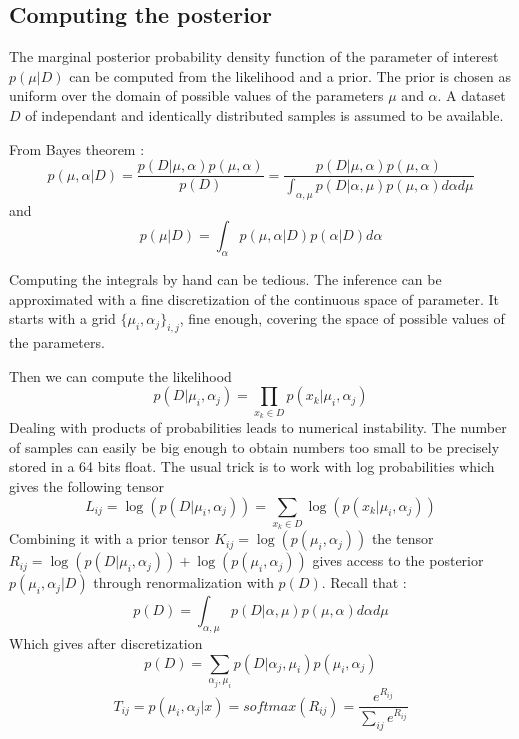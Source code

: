 \subsection{Computing the posterior} %
\label{sub:computing_the_posterior}

The marginal posterior probability density function of the parameter of interest $p(\mu|D)$ can be computed from the likelihood and a prior.
The prior is chosen as uniform over the domain of possible values of the parameters $\mu$ and $\alpha$.
A dataset $D$ of independant and identically distributed samples is assumed to be available.

From Bayes theorem : 
\begin{equation}
    p(\mu, \alpha | D) = \frac{p(D|\mu, \alpha) p(\mu, \alpha)}{p(D)} = \frac{p(D|\mu, \alpha) p(\mu, \alpha)}{\int_{\alpha, \mu} p(D|\alpha, \mu) p(\mu, \alpha) d\alpha d\mu}
\end{equation}
and
\begin{equation}
	p(\mu|D) = \int_{\alpha} p(\mu, \alpha | D) p(\alpha|D) d\alpha
\end{equation}

Computing the integrals by hand can be tedious.
The inference can be approximated with a fine discretization of the continuous space of parameter.
It starts with a grid $\{\mu_i, \alpha_j\}_{i,j}$, fine enough, covering the space of possible values of the parameters.

Then we can compute the likelihood
\begin{equation}
	p(D|\mu_i, \alpha_j) = \prod_{x_k\in D} p(x_k|\mu_i, \alpha_j)
\end{equation}
Dealing with products of probabilities leads to numerical instability.
The number of samples can easily be big enough to obtain numbers too small to be precisely stored in a 64 bits float.
The usual trick is to work with log probabilities which gives the following tensor 
\begin{equation}
	L_{ij} = \log (p(D|\mu_i, \alpha_j)) = \sum_{x_k\in D} \log (p(x_k|\mu_i, \alpha_j))
\end{equation}
Combining it with a prior tensor $K_{ij} = \log(p(\mu_i, \alpha_j))$ the tensor $ R_{ij} = \log(p(D|\mu_i, \alpha_j)) + \log(p(\mu_i, \alpha_j) )$ gives access to the posterior $p(\mu_i, \alpha_j | D)$ through renormalization with $p(D)$.
Recall that :
\begin{equation}
    p(D) = \int_{\alpha, \mu} p(D|\alpha, \mu) p(\mu, \alpha) d\alpha d\mu
\end{equation}
Which gives after discretization
\begin{equation}
    p(D) = \sum_{\alpha_j, \mu_i} p(D|\alpha_j, \mu_i) p(\mu_i, \alpha_j)
\end{equation}
\begin{equation}
	T_{ij} = p(\mu_i, \alpha_j | x) = softmax(R_{ij}) = \frac{ e^{ R_{ij} }  }{ \sum_{ij} e^{ R_{ij} } }
\end{equation}


